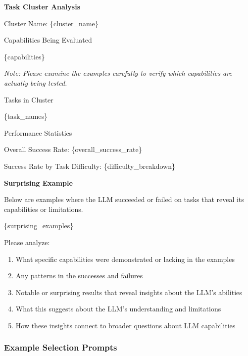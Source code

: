\begin{tcolorbox}[breakable,boxrule=0.5pt,sharp corners,fontupper=\small,
colback=orange!5!white, colframe=orange!80!black, title={Cluster Analysis Prompt}]
\textbf{Task Cluster Analysis}

Cluster Name: \{cluster\_name\}

Capabilities Being Evaluated

\{capabilities\}

\textit{Note: Please examine the examples carefully to verify which capabilities are actually being tested.}

Tasks in Cluster

\{task\_names\}

Performance Statistics

Overall Success Rate: \{overall\_success\_rate\}

Success Rate by Task Difficulty:
\{difficulty\_breakdown\}

\textbf{Surprising Example}

Below are examples where the LLM succeeded or failed on tasks that reveal its capabilities or limitations.

\{surprising\_examples\}

Please analyze:
\begin{enumerate}[leftmargin=2em]
    \item What specific capabilities were demonstrated or lacking in the examples
    \item Any patterns in the successes and failures
    \item Notable or surprising results that reveal insights about the LLM's abilities
    \item What this suggests about the LLM's understanding and limitations
    \item How these insights connect to broader questions about LLM capabilities
\end{enumerate}
\end{tcolorbox}

\subsubsection{Example Selection Prompts}

